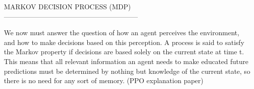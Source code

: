 MARKOV DECISION PROCESS (MDP)
-----------------------------------------------------------

We now must answer the question of how an agent perceives the environment, and how to make decisions based on this perception. A process is said to satisfy the Markov property if decisions are based solely on the current state at time t. This means that all relevant information an agent needs to make educated future predictions must be determined by nothing but knowledge of the current state, so there is no need for any sort of memory. (PPO explanation paper)

\frac{}{}